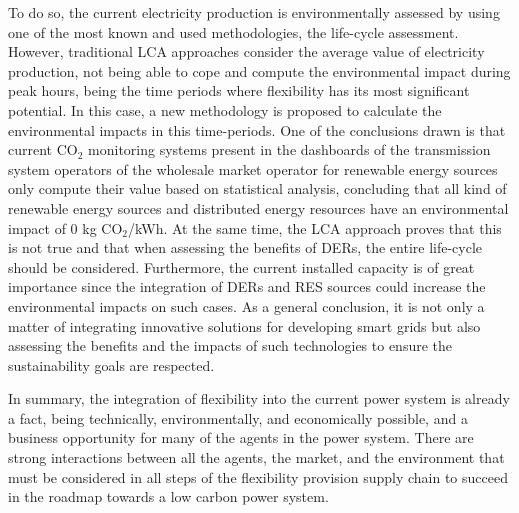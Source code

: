  To do so, the current electricity production is environmentally assessed by using one of the most known and used methodologies, the life-cycle assessment. However, traditional LCA approaches consider the average value of electricity production, not being able to cope and compute the environmental impact during peak hours, being the time periods where flexibility has its most significant potential. In this case, a new methodology is proposed to calculate the environmental impacts in this time-periods. One of the conclusions drawn is that current CO$_2$ monitoring systems present in the dashboards of the transmission system operators of the wholesale market operator for renewable energy sources only compute their value based on statistical analysis, concluding that all kind of renewable energy sources and distributed energy resources have an environmental impact of 0 kg CO$_2$/kWh. At the same time, the LCA approach proves that this is not true and that when assessing the benefits of DERs, the entire life-cycle should be considered. Furthermore, the current installed capacity is of great importance since the integration of DERs and RES sources could increase the environmental impacts on such cases. As a general conclusion, it is not only a matter of integrating innovative solutions for developing smart grids but also assessing the benefits and the impacts of such technologies to ensure the sustainability goals are respected. 

In summary, the integration of flexibility into the current power system is already a fact, being technically, environmentally, and economically possible, and a business opportunity for many of the agents in the power system. There are strong interactions between all the agents, the market, and the environment that must be considered in all steps of the flexibility provision supply chain to succeed in the roadmap towards a low carbon power system. 
     
